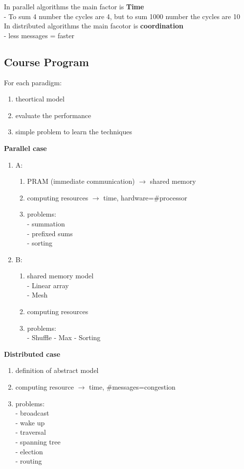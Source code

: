 In parallel algorithms the main factor is \textbf{Time}\\
- To sum 4 number the cycles are 4, but to sum 1000 number the cycles are 10\\
In distributed algorithms the main facotor is \textbf{coordination}\\
- less messages = faster

\subsection{Course Program}

For each paradigm:

\begin{enumerate}
 \item theortical model
 \item evaluate the performance
 \item simple problem to learn the techniques
\end{enumerate}

\textbf{Parallel case}

\begin{enumerate}
 \item A:
  \begin{enumerate}
   \item PRAM (immediate communication) $\rightarrow$ shared memory
   \item computing resources $\rightarrow$ time, hardware=\#processor
   \item problems:\\
    - summation\\
    - prefixed sums\\
    - sorting\\
  \end{enumerate}
 \item B:
  \begin{enumerate}
   \item shared memory model\\   
    - Linear array\\ 
    - Mesh
   \item computing resources
   \item problems:\\ 
    - Shuffle
    - Max
    - Sorting
  \end{enumerate}
\end{enumerate}

\textbf{Distributed case}

\begin{enumerate}
 \item definition of abstract  model
 \item computing resource $\rightarrow$ time, \#messages=congestion
 \item problems:\\
 - broadcast\\
 - wake up\\
 - traversal\\
 - spanning tree\\
 - election\\
 - routing
\end{enumerate}